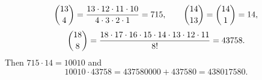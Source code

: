 \[\dbinom{13}{4}=\dfrac{13\cdot12\cdot11\cdot10}{4\cdot3\cdot2\cdot1}=715,\qquad\dbinom{14}{13}=\dbinom{14}{1}=14,\]
\[\dbinom{18}{8}=\dfrac{18\cdot17\cdot16\cdot15\cdot14\cdot13\cdot12\cdot11}{8!}=43758.\]
Then $715\cdot14=10010$ and
\[10010\cdot43758=437580000+437580=\boxed{438017580}.\]
